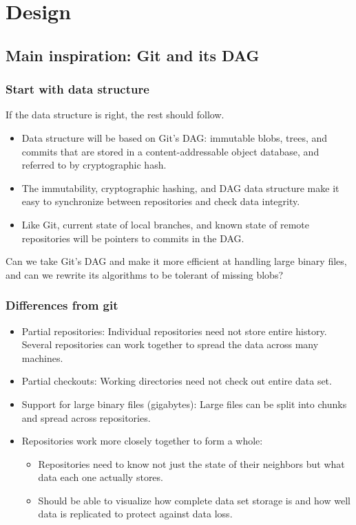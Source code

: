 \documentclass[a4paper]{article}
\begin{document}
\section{Design}\label{design}


\subsection{Main inspiration: Git and its DAG}\label{main-inspiration-git}

\subsubsection{Start with data structure}

If the data structure is right, the rest should follow.

\begin{itemize}
\item
  Data structure will be based on Git's DAG: immutable blobs, trees, and commits
  that are stored in a content-addressable object database, and referred to by
  cryptographic hash.
\item
  The immutability, cryptographic hashing, and DAG data structure make it easy
  to synchronize between repositories and check data integrity.
\item
  Like Git, current state of local branches, and known state of remote
  repositories will be pointers to commits in the DAG.
\end{itemize}

Can we take Git's DAG and make it more efficient at handling large binary files,
and can we rewrite its algorithms to be tolerant of missing blobs?

\subsubsection{Differences from git}

\begin{itemize}
\item
  Partial repositories: Individual repositories need not store entire
  history. Several repositories can work together to spread the data
  across many machines.
\item
  Partial checkouts: Working directories need not check out entire data
  set.
\item
  Support for large binary files (gigabytes): Large files can be split into
  chunks and spread across repositories.
\item
  Repositories work more closely together to form a whole:

  \begin{itemize}
  \item
    Repositories need to know not just the state of their neighbors but what
    data each one actually stores.
  \item
    Should be able to visualize how complete data set storage is and how
    well data is replicated to protect against data loss.
  \end{itemize}
\end{itemize}
\end{document}
